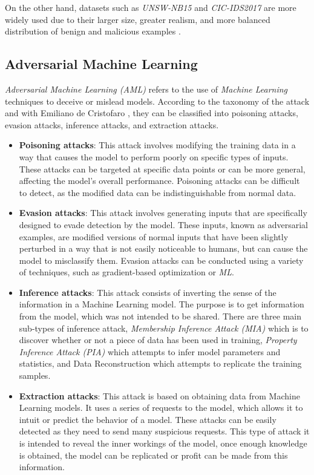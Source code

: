 On the other hand, datasets such as \textit{UNSW-NB15} and \textit{CIC-IDS2017} are more widely used due to their
larger size, greater realism, and more balanced distribution of benign and malicious examples .

\subsection{Adversarial Machine Learning}\label{subsec:adversarial-machine-learning}

\textit{Adversarial Machine Learning (AML)} refers to the use of \textit{Machine Learning} techniques to deceive or
mislead models.
According to the taxonomy of the attack and with Emiliano de Cristofaro \cite{de2020overview}, they can be classified into poisoning attacks, evasion attacks, inference
attacks, and extraction attacks.

\begin{itemize}
    \item \textbf{Poisoning attacks}: This attack involves modifying the training data in a way that causes the model to perform
    poorly on specific types of inputs.
    These attacks can be targeted at specific data points or can be more general, affecting the model's overall
    performance.
    Poisoning attacks can be difficult to detect, as the modified data can be indistinguishable from normal data.

    \item \textbf{Evasion attacks}: This attack involves generating inputs that are specifically designed to evade detection by the
    model.
    These inputs, known as adversarial examples, are modified versions of normal inputs that have been slightly
    perturbed in a way that is not easily noticeable to humans, but can cause the model to misclassify them.
    Evasion attacks can be conducted using a variety of techniques, such as gradient-based optimization or \textit{ML}.

    \item \textbf{Inference attacks}: This attack consists of inverting the sense of the information in a Machine Learning model. 
    The purpose is to get information from the model, which was not intended to be shared.
    There are three main sub-types of inference attack,
    \textit{Membership Inference Attack (MIA)} which is to discover whether or not a piece of data has been used in training,
    \textit{Property Inference Attack (PIA)} which attempts to infer model parameters and statistics,
    and Data Reconstruction which attempts to replicate the training samples.


    \item \textbf{Extraction attacks}: This attack is based on obtaining data from Machine Learning models.
    It uses a series of requests to the model, which allows it to intuit or predict the behavior of a model.
    These attacks can be easily detected as they need to send many suspicious requests.
    This type of attack it is intended to reveal the inner workings of the model,
    once enough knowledge is obtained, the model can be replicated or profit can be made from this information.  


\end{itemize}

